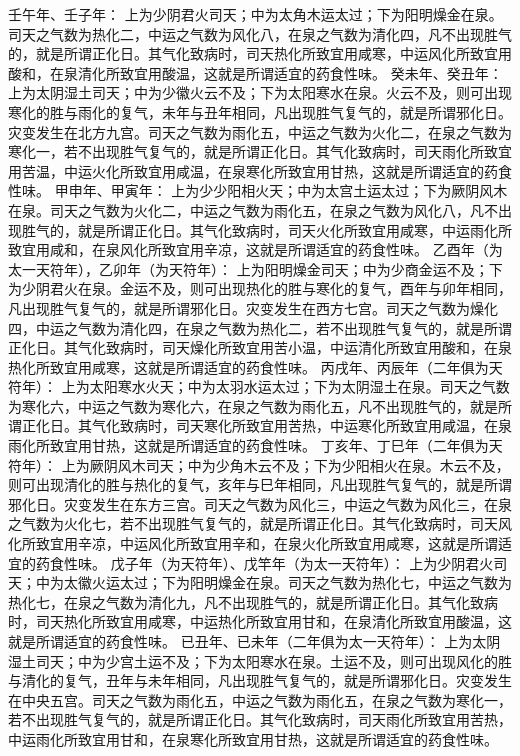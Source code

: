 \documentclass[12pt,UTF8]{ctexbook}
\begin{document}
壬午年、壬子年：
上为少阴君火司天；中为太角木运太过；下为阳明燥金在泉。司天之气数为热化二，中运之气数为风化八，在泉之气数为清化四，凡不出现胜气的，就是所谓正化日。其气化致病时，司天热化所致宜用咸寒，中运风化所致宜用酸和，在泉清化所致宜用酸温，这就是所谓适宜的药食性味。
癸未年、癸丑年：
上为太阴湿土司天；中为少徽火云不及；下为太阳寒水在泉。火云不及，则可出现寒化的胜与雨化的复气，未年与丑年相同，凡出现胜气复气的，就是所谓邪化日。灾变发生在北方九宫。司天之气数为雨化五，中运之气数为火化二，在泉之气数为寒化一，若不出现胜气复气的，就是所谓正化日。其气化致病时，司天雨化所致宜用苦温，中运火化所致宜用咸温，在泉寒化所致宜用甘热，这就是所谓适宜的药食性味。
甲申年、甲寅年：
上为少少阳相火天；中为太宫土运太过；下为厥阴风木在泉。司天之气数为火化二，中运之气数为雨化五，在泉之气数为风化八，凡不出现胜气的，就是所谓正化日。其气化致病时，司天火化所致宜用咸寒，中运雨化所致宜用咸和，在泉风化所致宜用辛凉，这就是所谓适宜的药食性味。
乙酉年（为太一天符年），乙卯年（为天符年）：
上为阳明燥金司天；中为少商金运不及；下为少阴君火在泉。金运不及，则可出现热化的胜与寒化的复气，酉年与卯年相同，凡出现胜气复气的，就是所谓邪化日。灾变发生在西方七宫。司天之气数为燥化四，中运之气数为清化四，在泉之气数为热化二，若不出现胜气复气的，就是所谓正化日。其气化致病时，司天燥化所致宜用苦小温，中运清化所致宜用酸和，在泉热化所致宜用咸寒，这就是所谓适宜的药食性味。
丙戌年、丙辰年（二年俱为天符年）：
上为太阳寒水火天；中为太羽水运太过；下为太阴湿土在泉。司天之气数为寒化六，中运之气数为寒化六，在泉之气数为雨化五，凡不出现胜气的，就是所谓正化日。其气化致病时，司天寒化所致宜用苦热，中运寒化所致宜用咸温，在泉雨化所致宜用甘热，这就是所谓适宜的药食性味。
丁亥年、丁巳年（二年俱为天符年）：
上为厥阴风木司天；中为少角木云不及；下为少阳相火在泉。木云不及，则可出现清化的胜与热化的复气，亥年与巳年相同，凡出现胜气复气的，就是所谓邪化日。灾变发生在东方三宫。司天之气数为风化三，中运之气数为风化三，在泉之气数为火化七，若不出现胜气复气的，就是所谓正化日。其气化致病时，司天风化所致宜用辛凉，中运风化所致宜用辛和，在泉火化所致宜用咸寒，这就是所谓适宜的药食性味。
戊子年（为天符年）、戊竿年（为太一天符年）：
上为少阴君火司天；中为太徽火运太过；下为阳明燥金在泉。司天之气数为热化七，中运之气数为热化七，在泉之气数为清化九，凡不出现胜气的，就是所谓正化日。其气化致病时，司天热化所致宜用咸寒，中运热化所致宜用甘和，在泉清化所致宜用酸温，这就是所谓适宜的药食性味。
已丑年、已未年（二年俱为太一天符年）：
上为太阴湿土司天；中为少宫土运不及；下为太阳寒水在泉。土运不及，则可出现风化的胜与清化的复气，丑年与未年相同，凡出现胜气复气的，就是所谓邪化日。灾变发生在中央五宫。司天之气数为雨化五，中运之气数为雨化五，在泉之气数为寒化一，若不出现胜气复气的，就是所谓正化日。其气化致病时，司天雨化所致宜用苦热，中运雨化所致宜用甘和，在泉寒化所致宜用甘热，这就是所谓适宜的药食性味。
\end{document}

